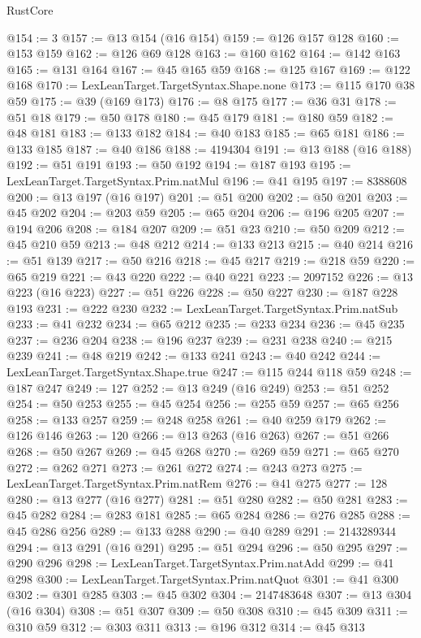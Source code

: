 \begin{lexlean}{RustCore}
\begin{coremodule}
@154 := 3
@157 := @13 @154 (@16 @154)
@159 := @126 @157 @128
@160 := @153 @159
@162 := @126 @69 @128
@163 := @160 @162
@164 := @142 @163
@165 := @131 @164
@167 := @45 @165 @59
@168 := @125 @167
@169 := @122 @168
@170 := LexLeanTarget.TargetSyntax.Shape.none
@173 := @115 @170 @38 @59
@175 := @39 (@169 @173)
@176 := @8 @175
@177 := @36 @31
@178 := @51 @18
@179 := @50 @178
@180 := @45 @179
@181 := @180 @59
@182 := @48 @181
@183 := @133 @182
@184 := @40 @183
@185 := @65 @181
@186 := @133 @185
@187 := @40 @186
@188 := 4194304
@191 := @13 @188 (@16 @188)
@192 := @51 @191
@193 := @50 @192
@194 := @187 @193
@195 := LexLeanTarget.TargetSyntax.Prim.natMul
@196 := @41 @195
@197 := 8388608
@200 := @13 @197 (@16 @197)
@201 := @51 @200
@202 := @50 @201
@203 := @45 @202
@204 := @203 @59
@205 := @65 @204
@206 := @196 @205
@207 := @194 @206
@208 := @184 @207
@209 := @51 @23
@210 := @50 @209
@212 := @45 @210 @59
@213 := @48 @212
@214 := @133 @213
@215 := @40 @214
@216 := @51 @139
@217 := @50 @216
@218 := @45 @217
@219 := @218 @59
@220 := @65 @219
@221 := @43 @220
@222 := @40 @221
@223 := 2097152
@226 := @13 @223 (@16 @223)
@227 := @51 @226
@228 := @50 @227
@230 := @187 @228 @193
@231 := @222 @230
@232 := LexLeanTarget.TargetSyntax.Prim.natSub
@233 := @41 @232
@234 := @65 @212
@235 := @233 @234
@236 := @45 @235
@237 := @236 @204
@238 := @196 @237
@239 := @231 @238
@240 := @215 @239
@241 := @48 @219
@242 := @133 @241
@243 := @40 @242
@244 := LexLeanTarget.TargetSyntax.Shape.true
@247 := @115 @244 @118 @59
@248 := @187 @247
@249 := 127
@252 := @13 @249 (@16 @249)
@253 := @51 @252
@254 := @50 @253
@255 := @45 @254
@256 := @255 @59
@257 := @65 @256
@258 := @133 @257
@259 := @248 @258
@261 := @40 @259 @179
@262 := @126 @146
@263 := 120
@266 := @13 @263 (@16 @263)
@267 := @51 @266
@268 := @50 @267
@269 := @45 @268
@270 := @269 @59
@271 := @65 @270
@272 := @262 @271
@273 := @261 @272
@274 := @243 @273
@275 := LexLeanTarget.TargetSyntax.Prim.natRem
@276 := @41 @275
@277 := 128
@280 := @13 @277 (@16 @277)
@281 := @51 @280
@282 := @50 @281
@283 := @45 @282
@284 := @283 @181
@285 := @65 @284
@286 := @276 @285
@288 := @45 @286 @256
@289 := @133 @288
@290 := @40 @289
@291 := 2143289344
@294 := @13 @291 (@16 @291)
@295 := @51 @294
@296 := @50 @295
@297 := @290 @296
@298 := LexLeanTarget.TargetSyntax.Prim.natAdd
@299 := @41 @298
@300 := LexLeanTarget.TargetSyntax.Prim.natQuot
@301 := @41 @300
@302 := @301 @285
@303 := @45 @302
@304 := 2147483648
@307 := @13 @304 (@16 @304)
@308 := @51 @307
@309 := @50 @308
@310 := @45 @309
@311 := @310 @59
@312 := @303 @311
@313 := @196 @312
@314 := @45 @313

\end{coremodule}
\end{lexlean}
